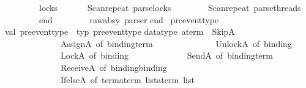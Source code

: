 \begin{isabellebody}
\ \ \ \ \ \ \ {\isacharminus}{\kern0pt}{\isacharminus}{\kern0pt}{\isacharbar}{\kern0pt}\ \isactrlkeyword {\isasymopen}locks{\isasymclose}\ \ \ \ \ \ {\isacharminus}{\kern0pt}{\isacharminus}{\kern0pt}\ {\isacharparenleft}{\kern0pt}Scan{\isachardot}{\kern0pt}repeat\ parse{\isacharunderscore}{\kern0pt}locks{\isacharparenright}{\kern0pt}\isanewline
\ \ \ \ \ \ \ {\isacharminus}{\kern0pt}{\isacharminus}{\kern0pt}\ {\isacharparenleft}{\kern0pt}Scan{\isachardot}{\kern0pt}repeat{}\ parse{\isacharunderscore}{\kern0pt}threads{\isacharparenright}{\kern0pt}\isanewline
\ \ \ \ \ \ \ {\isacharminus}{\kern0pt}{\isacharminus}{\kern0pt}{\isacharbar}{\kern0pt}\ \isactrlkeyword {\isasymopen}end{\isacharsemicolon}{\kern0pt}{\isasymclose}\isanewline
\ \ \ \ \ \ {\isacharparenright}{\kern0pt}\ {\isacharcolon}{\kern0pt}\ raw{\isacharunderscore}{\kern0pt}absy\ parser\isanewline
\isanewline
end\isanewline
{\isacartoucheclose}%
\endisatagML
{\isafoldML}%
%
\isadelimML
%
\endisadelimML
\isanewline
\isanewline
\isanewline
{}\isamarkupfalse%
\ pre{\isacharunderscore}{\kern0pt}event{\isacharunderscore}{\kern0pt}type%
\isadelimdocument
%
\endisadelimdocument
%
\isatagdocument
%
\isamarkuptrue%
%
\endisatagdocument
{\isafolddocument}%
%
\isadelimdocument
%
\endisadelimdocument
%
\isadelimML
%
\endisadelimML
%
\isatagML
{}\isamarkupfalse%
{\isacartoucheopen}\isanewline
val\ pre{\isacharunderscore}{\kern0pt}event{\isacharunderscore}{\kern0pt}type\ {\isacharequal}{\kern0pt}\ {\isacharat}{\kern0pt}{\isacharbraceleft}{\kern0pt}typ\ {\isasymopen}pre{\isacharunderscore}{\kern0pt}event{\isacharunderscore}{\kern0pt}type{\isasymclose}{\isacharbraceright}{\kern0pt}\isanewline
\isanewline
datatype\ a{\isacharunderscore}{\kern0pt}term\ {\isacharequal}{\kern0pt}\ SkipA\isanewline
\ \ \ \ \ \ \ \ \ \ \ \ {\isacharbar}{\kern0pt}\ AssignA\ of\ binding{\isacharasterisk}{\kern0pt}term\ \isanewline
\ \ \ \ \ \ \ \ \ \ \ \ {\isacharbar}{\kern0pt}\ UnlockA\ of\ binding\ \isanewline
\ \ \ \ \ \ \ \ \ \ \ \ {\isacharbar}{\kern0pt}\ LockA\ of\ binding\isanewline
\ \ \ \ \ \ \ \ \ \ \ \ {\isacharbar}{\kern0pt}\ SendA\ of\ binding{\isacharasterisk}{\kern0pt}term\ \isanewline
\ \ \ \ \ \ \ \ \ \ \ \ {\isacharbar}{\kern0pt}\ ReceiveA\ of\ binding{\isacharasterisk}{\kern0pt}binding\isanewline
\ \ \ \ \ \ \ \ \ \ \ \ {\isacharbar}{\kern0pt}\ IfelseA\ of\ {\isacharparenleft}{\kern0pt}term{\isacharasterisk}{\kern0pt}{\isacharparenleft}{\kern0pt}a{\isacharunderscore}{\kern0pt}term\ list{\isacharparenright}{\kern0pt}{\isacharparenright}{\kern0pt}{\isacharasterisk}{\kern0pt}{\isacharparenleft}{\kern0pt}a{\isacharunderscore}{\kern0pt}term\ list{\isacharparenright}{\kern0pt}\ \isanewline

\end{isabellebody}

